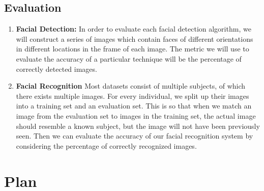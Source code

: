 \documentclass[11pt]{article} %
\theoremstyle{plain}
\theoremstyle{definition}
\theoremstyle{remark}
\numberwithin{equation}{section} %
\numberwithin{figure}{section} %
\numberwithin{table}{section} %
\begin{document}
\subsection{Evaluation}

\begin{enumerate}
  \item \textbf{Facial Detection:} In order to evaluate each facial detection algorithm, we will construct a series of images which contain faces of different orientations in different locations in the frame of each image. The metric we will use to evaluate the accuracy of a particular technique will be the percentage of correctly detected images.
    \item \textbf{Facial Recognition} Most datasets consist of multiple subjects, of which there exists multiple images. For every individual, we split up their images into a training set and an evaluation set. This is so that when we match an image from the evaluation set to images in the training set, the actual image should resemble a known subject, but the image will not have been previously seen. Then we can evaluate the accuracy of our facial recognition system by considering the percentage of correctly recognized images.
\end{enumerate}




\section{Plan}
\end{document}
